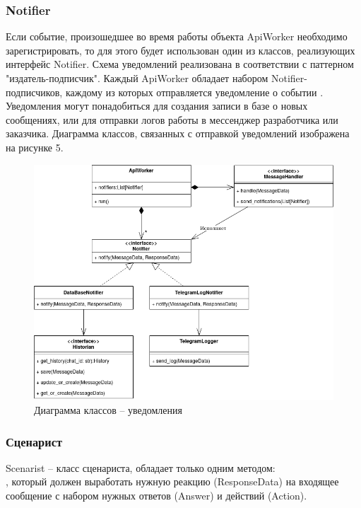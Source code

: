     \subsubsection{Notifier}
    Если событие, произошедшее во время работы объекта ApiWorker необходимо
    зарегистрировать, то для этого будет использован один из классов,
    реализующих интерфейс Notifier.
    Схема уведомлений реализована в соответствии с паттерном "издатель-подписчик".
    Каждый ApiWorker обладает набором Notifier-подписчиков, каждому из которых
    отправляется уведомление о событии .
    Уведомления могут понадобиться для создания записи в базе о новых сообщениях,
    или для отправки логов работы в мессенджер разработчика или заказчика.
    Диаграмма классов, связанных с отправкой уведомлений изображена на рисунке 5.
    \begin{figure}[H]
        \centering
        \includegraphics[width=0.9\linewidth]{static/ClassDiagram_notifiers.png}
        \caption{Диаграмма классов -- уведомления}
        \label{fig:class-diagram-notifiers}
    \end{figure}


    \subsubsection{Сценарист}
    Scenarist -- класс сценариста, обладает только одним методом:\\
    , который должен
    выработать нужную реакцию (ResponseData) на входящее сообщение с
    набором нужных ответов (Answer) и действий (Action).

